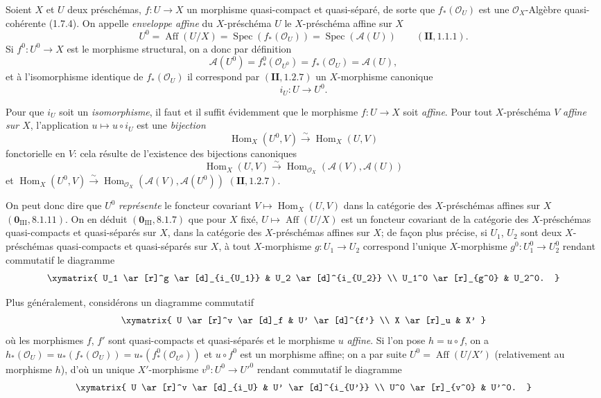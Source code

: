\begin{env}[21.12.1]
Soient $X$ et $U$ deux préschémas, $f:U\to X$ un morphisme quasi-compact et
quasi-séparé, de sorte que $f_*(\mathcal O_U)$ est une $\mathcal O_X$-Algèbre
quasi-cohérente (1.7.4). On appelle \emph{enveloppe affine} du $X$-préschéma $U$ le
$X$-préschéma affine sur $X$
\[
  U^0=\operatorname{Aff}(U/X)=\operatorname{Spec}(f_*(\mathcal O_U))
  =\operatorname{Spec}(\mathscr A(U))\qquad(\mathbf{II}, 1.1.1).
\]
Si $f^0:U^0\to X$ est le morphisme structural, on a donc par définition
\[
  \mathscr A(U^0)=f^0_*(\mathcal O_{U^0})=f_*(\mathcal O_U)=\mathscr A(U),
\]
et à l'isomorphisme identique de $f_*(\mathcal O_U)$ il correspond par
$(\mathbf{II}, 1.2.7)$ un $X$-morphisme canonique
\[
\label{IV.21.12.1.1}
  i_U:U\to U^0.
  \tag{21.12.1.1}
\]

Pour que $i_U$ soit un \emph{isomorphisme}, il faut et il suffit évidemment que le
morphisme $f:U\to X$ soit \emph{affine}. Pour tout $X$-préschéma $V$ \emph{affine sur
$X$}, l'application $u\mapsto u\circ i_U$ est une \emph{bijection}
\[
  \operatorname{Hom}_X(U^0,V)\xrightarrow{\sim}\operatorname{Hom}_X(U,V)
\]
fonctorielle en $V$: cela résulte de l'existence des bijections canoniques
\[
  \operatorname{Hom}_X(U,V)\xrightarrow{\sim}
  \operatorname{Hom}_{\mathcal O_X}(\mathscr A(V),\mathscr A(U))
\]
et
$\operatorname{Hom}_X(U^0,V)\xrightarrow{\sim}
\operatorname{Hom}_{\mathcal O_X}(\mathscr A(V),\mathscr A(U^0))$
$(\mathbf{II}, 1.2.7)$.

On peut donc dire que $U^0$ \emph{représente} le foncteur covariant
$V\mapsto\operatorname{Hom}_X(U,V)$ dans la catégorie des $X$-préschémas affines sur
$X$ $(\mathbf 0_{\mathrm{III}}, 8.1.11)$. On en déduit
$(\mathbf 0_{\mathrm{III}}, 8.1.7)$ que pour $X$ fixé,
$U\mapsto\operatorname{Aff}(U/X)$ est un foncteur covariant de la catégorie des
$X$-préschémas quasi-compacts et quasi-séparés sur $X$, dans la catégorie des
$X$-préschémas affines sur $X$; de façon plus précise, si $U_1$, $U_2$ sont deux
$X$-préschémas quasi-compacts et quasi-séparés sur $X$, à tout $X$-morphisme
$g:U_1\to U_2$ correspond l'unique $X$-morphisme $g^0:U_1^0\to U_2^0$ rendant
commutatif le diagramme
\[
  \xymatrix{
    U_1 \ar[r]^g \ar[d]_{i_{U_1}} & U_2 \ar[d]^{i_{U_2}} \\
    U_1^0 \ar[r]_{g^0} & U_2^0.
  }
\]
\end{env}

Plus généralement, considérons un diagramme commutatif
\[
  \xymatrix{
    U \ar[r]^v \ar[d]_f & U' \ar[d]^{f'} \\
    X \ar[r]_u & X'
  }
\]
où les morphismes $f$, $f'$ sont quasi-compacts et quasi-séparés et le morphisme $u$
\emph{affine}. Si l'on pose $h=u\circ f$, on a
$h_*(\mathcal O_U)=u_*(f_*(\mathcal O_U))=u_*(f^0_*(\mathcal O_{U^0}))$ et
$u\circ f^0$ est un morphisme affine; on a par suite
$U^0=\operatorname{Aff}(U/X')$ (relativement au morphisme $h$), d'où un unique
$X'$-morphisme $v^0:U^0\to U'^0$ rendant commutatif le diagramme
\[
  \xymatrix{
    U \ar[r]^v \ar[d]_{i_U} & U' \ar[d]^{i_{U'}} \\
    U^0 \ar[r]_{v^0} & U'^0.
  }
\]

